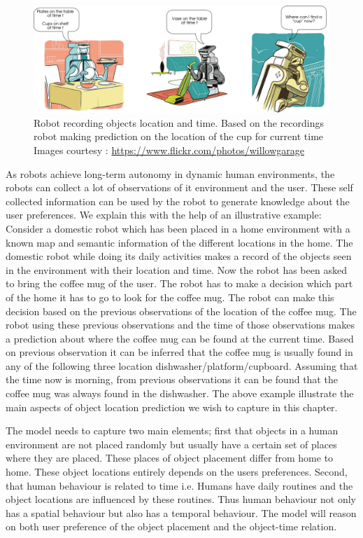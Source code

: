 \begin{figure}[htp]
\centering
\includegraphics[scale=0.4]{pictures/scenario.png}
\caption[Example scenario of robot recording objects location and time]{Robot recording objects location and time. Based on the
recordings robot making prediction on the location of the cup for current time
Images courtesy : \url{https://www.flickr.com/photos/willowgarage} }
\label{scenario}
\end{figure}

As robots achieve long-term autonomy in dynamic human environments, the robots can collect a lot of observations of it environment and the user. These self collected information can be used by the robot to generate knowledge about the user preferences. We explain this with the help of an illustrative example: 
Consider a domestic robot which has been placed in a home environment with a known map and semantic information of the different locations in the home. The domestic robot while doing its daily activities  makes a record of the objects seen in the environment with their location and time. Now the robot has been asked to bring the coffee mug of the user.
The robot has to make a decision which part of the home it has to go to look for
the coffee mug. The robot can make this decision based on the previous observations of the  location of the coffee mug.
The robot using these previous observations and the time of those observations 
makes a prediction about where the coffee mug can be found at the current time.
Based on previous observation it can be inferred that the coffee mug is usually found in any of the following three location dishwasher/platform/cupboard. Assuming that the time now is morning, from previous observations it can be found that the coffee mug was always found  in the dishwasher. The above example illustrate the main aspects of object location prediction we wish to capture in this chapter.


The model needs to capture two main elements; first that objects in a human environment are not placed randomly but usually have a certain set of places where they are placed. These places of object placement differ from home to home. These object locations entirely depends on the users preferences.  
Second, that human behaviour is related to time i.e. Humans have daily routines  and the object locations are influenced by these routines.
Thus human behaviour not only  has a spatial behaviour but also has a temporal behaviour.
The model will reason on both user preference of the object placement and the
object-time relation.

